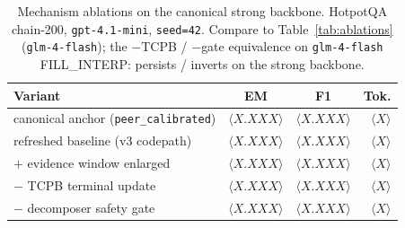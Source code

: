 
\begin{table}[t]
\centering
\small
\setlength{\tabcolsep}{3pt}
\begin{tabular}{@{}lccr@{}}
\toprule
\textbf{Variant} & \textbf{EM} & \textbf{F1} & \textbf{Tok.} \\
\midrule
canonical anchor (\texttt{peer\_calibrated})   & $\langle X.XXX \rangle$ & $\langle X.XXX \rangle$ & $\langle X \rangle$ \\
refreshed baseline (v3 codepath)               & $\langle X.XXX \rangle$ & $\langle X.XXX \rangle$ & $\langle X \rangle$ \\
\;\;$+$ evidence window enlarged               & $\langle X.XXX \rangle$ & $\langle X.XXX \rangle$ & $\langle X \rangle$ \\
\;\;$-$ TCPB terminal update                   & $\langle X.XXX \rangle$ & $\langle X.XXX \rangle$ & $\langle X \rangle$ \\
\;\;$-$ decomposer safety gate                 & $\langle X.XXX \rangle$ & $\langle X.XXX \rangle$ & $\langle X \rangle$ \\
\bottomrule
\end{tabular}
\caption{Mechanism ablations on the canonical strong backbone. HotpotQA chain-200, \texttt{gpt-4.1-mini}, \texttt{seed=42}. Compare to Table~\ref{tab:ablations} (\texttt{glm-4-flash}); the $-$TCPB / $-$gate equivalence on \texttt{glm-4-flash} \langle FILL\_INTERP: persists / inverts \rangle on the strong backbone.}
\label{tab:ablations-strong-backbone}
\end{table}


